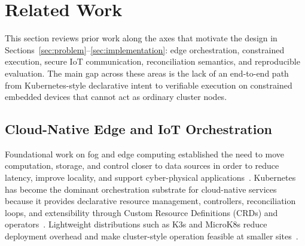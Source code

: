 \section{Related Work}\label{sec:related-work}

This section reviews prior work along the axes that motivate the design in Sections~\ref{sec:problem}--\ref{sec:implementation}: edge orchestration, constrained execution, secure IoT communication, reconciliation semantics, and reproducible evaluation. The main gap across these areas is the lack of an end-to-end path from Kubernetes-style declarative intent to verifiable execution on constrained embedded devices that cannot act as ordinary cluster nodes.

\subsection{Cloud-Native Edge and IoT Orchestration}
Foundational work on fog and edge computing established the need to move computation, storage, and control closer to data sources in order to reduce latency, improve locality, and support cyber-physical applications~\cite{bonomi_fog,shi_edge,satyanarayanan_edge,chiang_fog}. Kubernetes has become the dominant orchestration substrate for cloud-native services because it provides declarative resource management, controllers, reconciliation loops, and extensibility through Custom Resource Definitions (CRDs) and operators~\cite{kubernetes,kubernetes_operators}. Lightweight distributions such as K3s and MicroK8s reduce deployment overhead and make cluster-style operation feasible at smaller sites~\cite{k3s,microk8s}.

